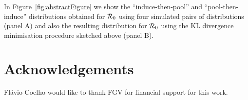 \documentclass[11pt]{article}
\begin{document}
In Figure~\ref{fig:abstractFigure} we show the ``induce-then-pool'' and 
``pool-then-induce'' distributions obtained for ${\cal R}_0$ using four 
simulated pairs of distributions (panel A) and also the resulting distribution 
for ${\cal R}_0$ using the KL divergence minimisation procedure sketched above 
(panel B).

\section*{Acknowledgements}
Fl\'avio Coelho would like to thank FGV for financial support for this work.


\end{document}
